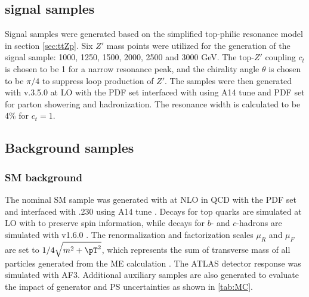 \documentclass[../thesis.tex]{subfiles}
\begin{document}
\subsection{\ttZp signal samples}
Signal \ttZp samples were generated based on the simplified top-philic resonance model in section \ref{sec:ttZp}. Six $Z'$ mass points were utilized for the generation of the signal sample: 1000, 1250, 1500, 2000, 2500 and 3000 GeV. The top-$Z'$ coupling $c_t$ is chosen to be 1 for a narrow resonance peak, and the chirality angle $\theta$ is chosen to be $\pi/4$ to suppress loop production of $Z'$. The samples were then generated with \mgamc v.3.5.0 \citep{Alwall:2014hca} at \acs{LO} with the \nnpdfonelo \citep{Ball:2014uwa} \acs{PDF} set interfaced with \pythia \citep{Sjostrand:2014zea} using A14 tune and \nnpdftwo \acs{PDF} set for parton showering and hadronization. The resonance width is calculated to be $4\%$ for $c_t=1$.

\subsection{Background samples}

\subsubsection*{\acs{SM} \tttt background}
The nominal \acs{SM} \tttt sample was generated with \mgamc \citep{Alwall:2014hca} at \acs{NLO} in \acs{QCD} with the \nnpdfnlo \citep{Ball:2014uwa} \acs{PDF} set and interfaced with \pythia.230 \citep{Sjostrand:2014zea} using A14 tune \citep{ATL-PHYS-PUB-2014-021}. Decays for top quarks are simulated at \acs{LO} with \madspin \citep{Frixione:2007zp, Artoisenet:2012st} to preserve spin information, while decays for $b$- and $c$-hadrons are simulated with \evtgen v1.6.0 \citep{Lange:2001uf}. The renormalization and factorization scales $\mu_R$ and $\mu_F$ are set to $1/4\sqrt{m^2+\pT^2}$, which represents the sum of transverse mass of all particles generated from the \acs{ME} calculation \citep{Frederix:2017wme}. The ATLAS detector response was simulated with \acs{AF3}. Additional auxiliary \tttt samples are also generated to evaluate the impact of generator and \acs{PS} uncertainties as shown in \ref{tab:MC}.
\end{document}
